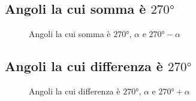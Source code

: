 \subsection{Angoli la cui somma è $\ang{270}$}
\begin{figure} %
	\centering
	
	\caption{Angoli la cui somma è $\ang{270}$,  $\alpha$ e $\ang{270}-\alpha$}
	\label{tab:angolicomplementari3}
\end{figure}
\subsection{Angoli la cui differenza è $\ang{270}$}
\begin{figure} %
	\centering
	
	\caption{Angoli la cui differenza è $\ang{270}$, $\alpha$ e $\ang{270}+\alpha$}
	\label{tab:angolicomplementari4}
\end{figure}
